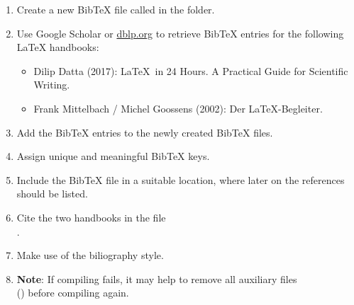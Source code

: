 \begin{enumerate}
  \item Create a new Bib\TeX{} file called  in the  folder.
  \item Use Google Scholar or \url{dblp.org} to retrieve Bib\TeX{} entries for the following \LaTeX{}
  handbooks:
  \begin{itemize}
    \item Dilip Datta (2017): \LaTeX\ in 24 Hours. A Practical Guide for Scientific Writing.
    \item Frank Mittelbach / Michel Goossens (2002): Der \LaTeX-Begleiter.
  \end{itemize}
  \item Add the Bib\TeX{} entries to the newly created Bib\TeX{} files.
  \item Assign unique and meaningful Bib\TeX{} keys.
  \item Include the Bib\TeX{} file in a suitable location, where later on the references should be listed.
  \item Cite the two handbooks in the 
  file\\.
  \item Make use of the  biliography style.
  \item \textbf{Note}: If compiling fails, it may help to remove all auxiliary 
  files \\() before compiling again.
\end{enumerate}

